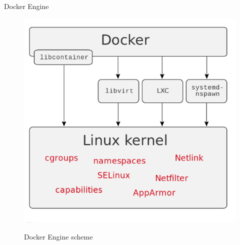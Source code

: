 \begin{frame}{Docker Engine}
\begin{figure}
  \centering
  \includegraphics[scale=.3]{dockerScheme.png}
  \label{fig:dockerscheme}
  \caption{Docker Engine scheme}
\end{figure}
\end{frame}
